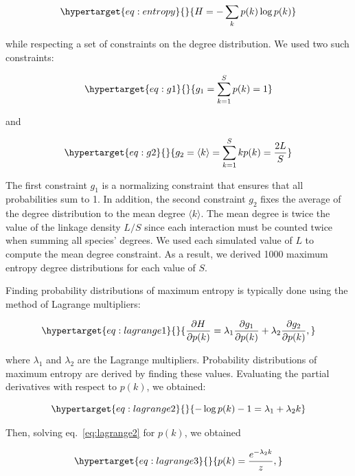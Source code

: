 \documentclass[10pt,oneside]{article}
\begin{document}
\begin{equation}\protect\hypertarget{eq:entropy}{}{H = -\sum_{k} p(k) \log p(k)}\label{eq:entropy}\end{equation}

while respecting a set of constraints on the degree distribution. We
used two such constraints:

\begin{equation}\protect\hypertarget{eq:g1}{}{g_1 = \sum_{k=1}^{S} p(k) = 1}\label{eq:g1}\end{equation}

and

\begin{equation}\protect\hypertarget{eq:g2}{}{g_2 = \langle k \rangle = \sum_{k=1}^{S} k p(k) = \frac{2L}{S}}\label{eq:g2}\end{equation}

The first constraint \(g_1\) is a normalizing constraint that ensures
that all probabilities sum to 1. In addition, the second constraint
\(g_2\) fixes the average of the degree distribution to the mean degree
\(\langle k \rangle\). The mean degree is twice the value of the linkage
density \(L/S\) since each interaction must be counted twice when
summing all species' degrees. We used each simulated value of \(L\) to
compute the mean degree constraint. As a result, we derived 1000 maximum
entropy degree distributions for each value of \(S\).

Finding probability distributions of maximum entropy is typically done
using the method of Lagrange multipliers:

\begin{equation}\protect\hypertarget{eq:lagrange1}{}{\frac{\partial H}{\partial p(k)} = \lambda_1 \frac{\partial g_1}{\partial p(k)} + \lambda_2 \frac{\partial g_2}{\partial p(k)},}\label{eq:lagrange1}\end{equation}

where \(\lambda_1\) and \(\lambda_2\) are the Lagrange multipliers.
Probability distributions of maximum entropy are derived by finding
these values. Evaluating the partial derivatives with respect to
\(p(k)\), we obtained:

\begin{equation}\protect\hypertarget{eq:lagrange2}{}{-\log p(k) - 1 = \lambda_1 + \lambda_2 k}\label{eq:lagrange2}\end{equation}

Then, solving eq.~\ref{eq:lagrange2} for \(p(k)\), we obtained

\begin{equation}\protect\hypertarget{eq:lagrange3}{}{p(k) = \frac{e^{-\lambda_2k}}{z},}\label{eq:lagrange3}\end{equation}
\end{document}
